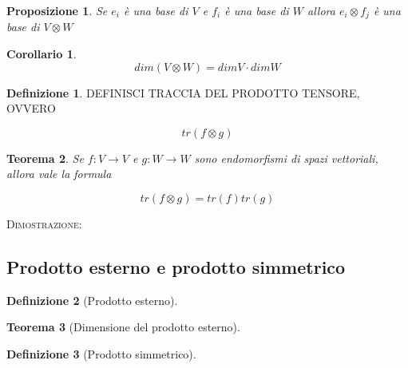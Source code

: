 \documentclass[11pt]{article}
\theoremstyle{plain}
\newtheorem{thm}{Teorema}[section]
\newtheorem{prop}[thm]{Proposizione}
\newtheorem*{cor}{Corollario}
\theoremstyle{definition}
\newtheorem{defn}{Definizione}[section]
\theoremstyle{remark}
\begin{document}
\begin{prop}

Se $e_i$ è una base di $V$ e $f_i$ è una base di $W$ allora $e_i \otimes f_j$ è una base di $V \otimes W$
\end{prop}


\begin{cor}
\[dim(V \otimes W) = dim V \cdot dim W \]

\end{cor}

















\begin{defn}
DEFINISCI TRACCIA DEL PRODOTTO TENSORE, OVVERO 

\[ tr(f\otimes g)\]

\end{defn}


\begin{thm}
Se $f:V\to V$ e $g:W\to W$ sono endomorfismi di spazi vettoriali, allora vale la formula

\[tr(f\otimes g) = tr(f) tr(g)  \]

\end{thm}

\textsc{Dimostrazione:}


\subsection{Prodotto esterno e prodotto simmetrico}



\begin{defn}[Prodotto esterno]


\label{defn:prodotto esterno}
\end{defn}





\begin{thm}[Dimensione del prodotto esterno]



\label{thm:prodotto esterno}
\end{thm}








\begin{defn}[Prodotto simmetrico]


\label{defn:prodotto simmetrico}
\end{defn}
\end{document}
